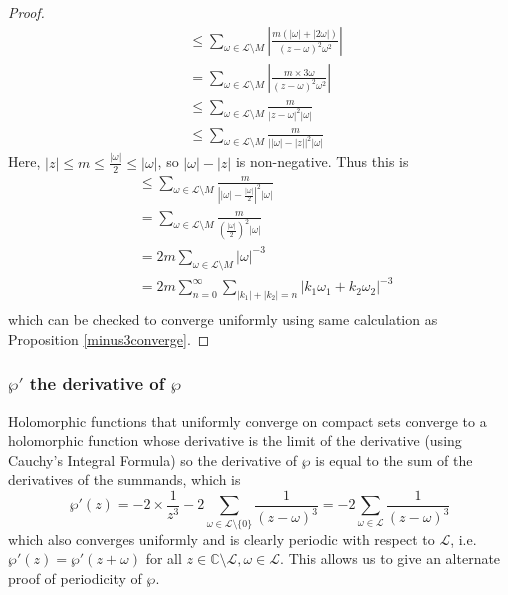 \documentclass{article}
\theoremstyle{definition}
\theoremstyle{definition}
\theoremstyle{definition}
\begin{document}
\begin{proof}
\begin{align*}
&\leq\sum_{\omega\in\mathcal{L}\setminus M}\left|\frac{m(|\omega|+|2\omega|)}{(z-\omega)^2\omega^2}\right|\\
&=\sum_{\omega\in\mathcal{L}\setminus M}\left|\frac{m \times3\omega}{(z-\omega)^2\omega^2}\right|\\
&\leq\sum_{\omega\in\mathcal{L}\setminus M}\frac{m}{|z-\omega|^2|\omega|}\\
&\leq\sum_{\omega\in\mathcal{L}\setminus M}\frac{m}{\left||\omega|-|z|\right|^2|\omega|}
\end{align*}
Here, $|z|\leq m\leq \frac{|\omega|}{2}\leq|\omega|$, so $|\omega|-|z|$ is non-negative. Thus this is
\begin{align*}
&\leq\sum_{\omega\in\mathcal{L}\setminus M}\frac{m}{\left||\omega|-\frac{|\omega|}{2}\right|^2|\omega|}\\
&=\sum_{\omega\in\mathcal{L}\setminus M}\frac{m}{\left(\frac{|\omega|}{2}\right)^2|\omega|}\\
&=2m\sum_{\omega\in\mathcal{L}\setminus M}|\omega|^{-3}\\
&=2m\sum_{n=0}^{\infty}\sum_{|k_1|+|k_2|=n}|k_1\omega_1+k_2\omega_2|^{-3}\\
\end{align*}
which can be checked to converge uniformly using same calculation as Proposition \ref{minus3converge}.
\end{proof}


\subsubsection{$\wp'$ the derivative of $\wp$}

Holomorphic functions that uniformly converge on compact sets converge to a holomorphic function whose derivative is the limit of the derivative (using Cauchy's Integral Formula) so the derivative of $\wp$ is equal to the sum of the derivatives of the summands, which is
$$\wp'(z)=-2\times\frac{1}{z^3}-2\sum_{\omega\in\mathcal L\setminus\{0\}}\frac{1}{(z-\omega)^3}=-2\sum_{\omega\in\mathcal L}\frac{1}{(z-\omega)^3}$$
which also converges uniformly and is clearly periodic with respect to $\mathcal L$, i.e. $\wp'(z)=\wp'(z+\omega)$ for all $z\in\mathbb C\setminus\mathcal L,\omega\in\mathcal L$. This allows us to give an alternate proof of periodicity of $\wp$.
\end{document}
